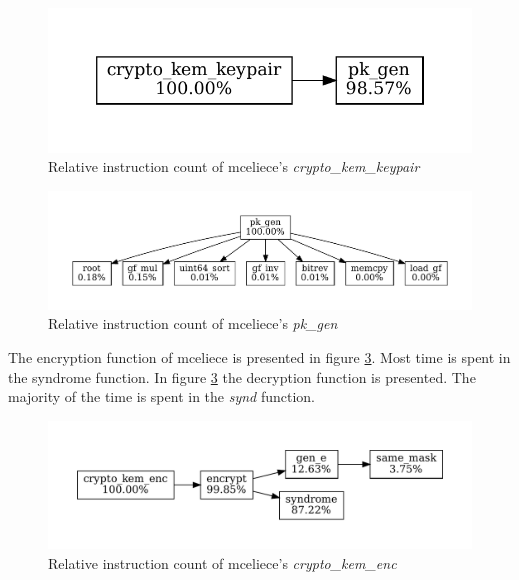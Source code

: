 \begin{figure}[H]
    \centering
    \includegraphics[scale=0.5]{chapters/results/hot-paths/classic-mceliece/8192128/crypto_kem_keypair.pdf}
    \caption{Relative instruction count of \gls{mceliece}'s \textit{crypto\_kem\_keypair}}
    \label{figure:result:hot-paths:classic-mceliece:crypto_kem_keypair}
\end{figure}

\begin{figure}[H]
    \centering
    \includegraphics[scale=0.5]{chapters/results/hot-paths/classic-mceliece/8192128/pk_gen.pdf}
    \caption{Relative instruction count of \gls{mceliece}'s \textit{pk\_gen}}
    \label{figure:result:hot-paths:classic-mceliece:pk_gen}
\end{figure}

The encryption function of \gls{mceliece} is presented in figure \ref{figure:result:hot-paths:classic-mceliece:crypto_kem_enc}. Most time is spent in the syndrome function. In figure \ref{figure:result:hot-paths:classic-mceliece:crypto_kem_enc} the decryption function is presented. The majority of the time is spent in the \textit{synd} function.

\begin{figure}[H]
    \centering
    \includegraphics[scale=0.5]{chapters/results/hot-paths/classic-mceliece/8192128/crypto_kem_enc.pdf}
    \caption{Relative instruction count of \gls{mceliece}'s \textit{crypto\_kem\_enc}}
    \label{figure:result:hot-paths:classic-mceliece:crypto_kem_enc}
\end{figure}


